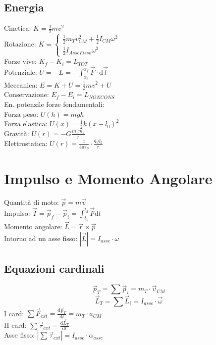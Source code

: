 \documentclass{article}
\begin{document}
\begin{small}
\begin{multicols}{3}
	\subsection{Energia}
		Cinetica: $ K = \frac{1}{2} m v^2 $ \\
		Rotazione: $ K = \begin{cases} \frac{1}{2} m_T v_{CM}^2 + \frac{1}{2} I_{CM} \omega^2 \\
				\frac{1}{2} I_{AsseFisso} \omega^2 \end{cases} $ \\
		Forze vive: $ K_f - K_i = L_{TOT} $ \\
		Potenziale: $ U = - L = - \int_{x_i}^{x_f} \vec F \cdot \mathrm d \vec l $ \\
		Meccanica: $ E = K + U = \frac{1}{2} m v^2 + U $ \\
		Conservazione: $ E_f - E_i = L_{NON CONS} $ \\
		En. potenzile forze fondamentali: \\
		Forza peso: $ U ( h ) = m g h $ \\
		Forza elastica: $ U ( x ) = \frac{1}{2} k ( x - l_0 )^2 $ \\
		Gravità: $ U( r ) = - G \frac{ m_1 m_2 }{ r } $ \\
		Elettrostatica: $ U ( r ) = \frac{1}{ 4 \pi \varepsilon_0 } \cdot \frac{ q_1 q_2 }{ r } $
\section{Impulso e Momento Angolare}
		Quantità di moto: $ \vec p = m \vec v $ \\
		Impulso: $ \vec I = \vec p_f - \vec p_i = \int_{t_1}^{t_2} \vec F \mathrm d t $ \\
		Momento angolare: $ \vec L = \vec r \times \vec p $ \\
		Intorno ad un asse fisso: $ | \vec L | = I_{asse} \cdot \omega $
	\subsection{Equazioni cardinali}
		\[ \vec p_T = \sum \vec p_i = m_T \cdot \vec v_{CM} \]
		\[ \vec L_T = \sum \vec L_i = I_{asse} \cdot \vec \omega \]
		I card: $ \sum \vec F_{ext} = \frac{ \mathrm d \vec p_T }{ \mathrm d t } = m_T \cdot a_{CM} $ \\
		II card: $ \sum \vec \tau_{ext} = \frac{ \mathrm d \vec L_T }{ \mathrm d t } $ \\
		Asse fisso: $ | \sum \vec \tau_{ext} | = I_{asse} \cdot \alpha_{asse} $

\end{multicols}
\end{small}
\end{document}
